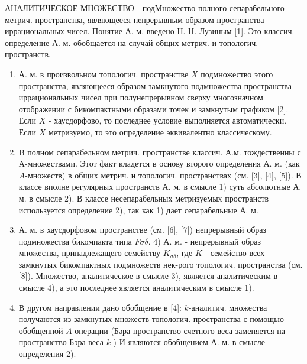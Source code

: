 \documentclass[10pt]{article}
\begin{document}
АНАЛИТИЧЕСКОЕ МНОЖЕСТВО - подМножество полного сепарабельного метрич. пространства, являющееся непрерывным образом пространства иррациональных чисел. Понятие А. м. введено Н. Н. Лузиным [1]. Это классич. определение А. м. обобщается на случай общих метрич. и топологич. пространств.



\begin{enumerate}

  \item А. м. в произвольном топологич. пространстве $X$ подмножество этого пространства, являющееся образом замкнутого подмножества пространства иррациональных чисел при полунепрерывном сверху многозначном отображении с бикомпактными образами точек и замкнутым графиком [2]. Если $X$ - хаусдорфово, то последнее условие выполняется автоматически. Если $X$ метризуемо, то это определение эквивалентно классическому.



  \item B полном сепарабельном метрич. пространстве классич. А.м. тождественны с $А$-множествами. Этот факт кладется в основу второго определения А. м. (как $A$-множеств) в общих метрич. и топологич. пространствах (см. [3], [4], [5]). В классе вполне регулярных пространств А. м. в смысле 1) суть абсолютные А. м. в смысле 2). В классе несепарабельных метризуемых пространств используется определение 2), так как 1) дает сепарабельные А. м.



  \item А. м. в хаусдорфовом пространстве (см. [6], [7]) непрерывный образ подмножества бикомпакта типа $F \sigma \delta$. 4) А. м. - непрерывный образ множества, принадлежащего семейству $K_{\sigma \delta}$, где $K$ - семейство всех замкнутых бикомпактных подмножеств нек-рого топологич. пространства (см. [8]). Множество, аналитическое в смысле 3), является аналитическим в смысле 4), а это последнее является аналитическим в смысле 1).



  \item В другом направлении дано обобщение в [4]: $k$-аналитич. множества получаются из замкнутых множеств топологич. пространства с помощью обобщенной $A$-операции (Бәра пространство счетного веса заменяется на пространство Бэра веса $k$ ) И являются обобщением А. м. в смысле определения 2).



\end{enumerate}
\end{document}
